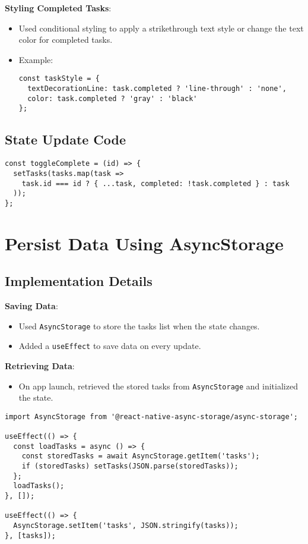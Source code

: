 \documentclass[12pt]{article}
\begin{document}
\textbf{Styling Completed Tasks}:
\begin{itemize}
    \item Used conditional styling to apply a strikethrough text style or change the text color for completed tasks.
    \item Example:
    \begin{verbatim}
const taskStyle = {
  textDecorationLine: task.completed ? 'line-through' : 'none',
  color: task.completed ? 'gray' : 'black'
};
    \end{verbatim}
\end{itemize}

\subsection{State Update Code}
\begin{verbatim}
const toggleComplete = (id) => {
  setTasks(tasks.map(task =>
    task.id === id ? { ...task, completed: !task.completed } : task
  ));
};
\end{verbatim}



\section{Persist Data Using AsyncStorage }

\subsection{Implementation Details}

\textbf{Saving Data}:
\begin{itemize}
    \item Used \texttt{AsyncStorage} to store the tasks list when the state changes.
    \item Added a \texttt{useEffect} to save data on every update.
\end{itemize}

\textbf{Retrieving Data}:
\begin{itemize}
    \item On app launch, retrieved the stored tasks from \texttt{AsyncStorage} and initialized the state.
\end{itemize}


\begin{verbatim}
import AsyncStorage from '@react-native-async-storage/async-storage';

useEffect(() => {
  const loadTasks = async () => {
    const storedTasks = await AsyncStorage.getItem('tasks');
    if (storedTasks) setTasks(JSON.parse(storedTasks));
  };
  loadTasks();
}, []);

useEffect(() => {
  AsyncStorage.setItem('tasks', JSON.stringify(tasks));
}, [tasks]);
\end{verbatim}
\end{document}
